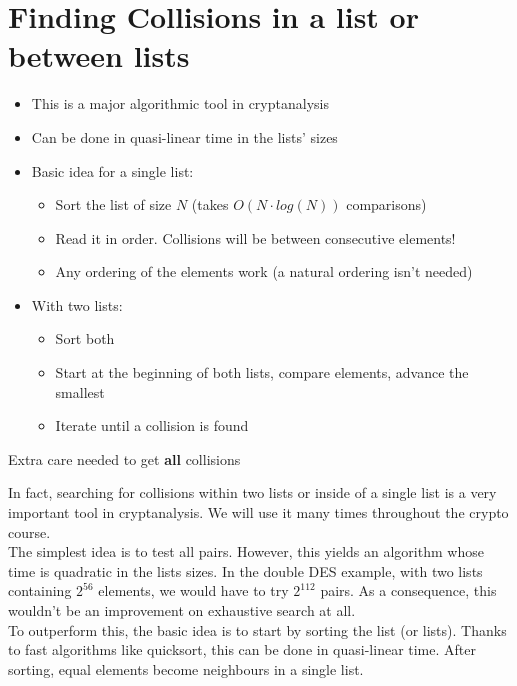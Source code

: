 \section{Finding Collisions in a list or between lists}
	\begin{itemize}
	    \item This is a major algorithmic tool in cryptanalysis
	    \item Can be done in quasi-linear time in the lists’ sizes\\
	    \item Basic idea for a single list:
	    \begin{itemize}
	        \item Sort the list of size $N$ (takes $O(N \cdot log(N))$ comparisons)
	        \item Read it in order. Collisions will be between consecutive elements!
	        \item Any ordering of the elements work (a natural ordering isn’t needed)\\
	    \end{itemize}
	    \item With two lists:
	    \begin{itemize}
	        \item Sort both
	        \item Start at the beginning of both lists, compare elements, advance the smallest
	        \item Iterate until a collision is found
	    \end{itemize}
	\end{itemize}
	\begin{center}
	    Extra care needed to get \textbf{all} collisions
	\end{center}
	In fact, searching for collisions within two lists or inside of a single list is a very important tool in cryptanalysis. 
	We will use it many times throughout the crypto course.\\
	The simplest idea is to test all pairs. However, this yields an algorithm whose time is quadratic in the lists sizes. 
	In the double DES example, with two lists containing $2^{56}$ elements, we would have to try $2^{112}$ pairs. 
	As a consequence, this wouldn’t be an improvement on exhaustive search at all.\\
	To outperform this, the basic idea is to start by sorting the list (or lists). 
	Thanks to fast algorithms like quicksort, this can be done in quasi-linear time. 
	After sorting, equal elements become neighbours in a single list. 
